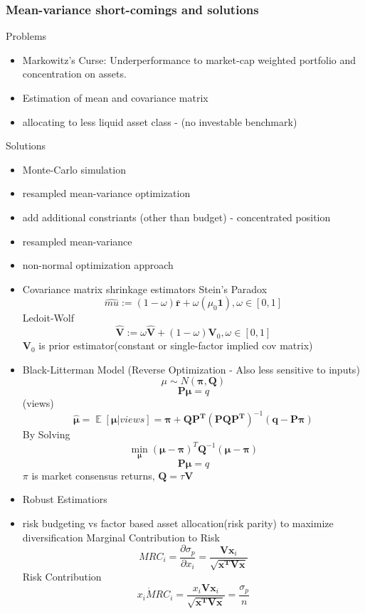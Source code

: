 \documentclass[11pt, openany]{book}              %
\DeclareMathOperator{\E}{\mathbb{E}}
\begin{document}
\subsubsection{Mean-variance short-comings and solutions}

Problems
\begin{itemize}
	\item Markowitz's Curse: Underperformance to market-cap weighted portfolio and concentration on assets.
	\item Estimation of mean and covariance matrix
	\item  allocating to less liquid asset class - (no investable benchmark)
\end{itemize}

Solutions
\begin{itemize}
	\item Monte-Carlo simulation
	\item resampled mean-variance optimization
    \item add additional constriants (other than budget) - concentrated position
    \item resampled mean-variance
    \item  non-normal optimization approach
     \item Covariance matrix shrinkage estimators
      \subitem Stein's Paradox 
      $$\hat{mu} := (1-\omega) \bar{\mathbf{r}} + \omega(\mu_0 \mathbf{1}),\omega \in [0,1]$$
      \subitem Ledoit-Wolf
      $$\hat{\mathbf{V}} := \omega\hat{\mathbf{V}} + (1-\omega)\mathbf{V}_0 ,\omega \in [0,1]$$
      $\mathbf{V}_0$ is prior estimator(constant or single-factor implied cov matrix) 
     \item Black-Litterman Model (Reverse Optimization - Also less sensitive to inputs)
     $$ \mu \sim N(\mathbf{\pi}, \mathbf{Q})$$
     $$ \boldsymbol{P\mu} = q$$ (views)
     $$ \hat{\boldsymbol{\mu}} = \E[\boldsymbol{\mu} | views] = \boldsymbol{\pi} + \mathbf{QP^T}(\mathbf{PQP^T})^{-1}(\mathbf{q} - \boldsymbol{P\pi})$$
     By Solving
     $$ \min_{\boldsymbol{\mu}}(\boldsymbol{\mu} - \boldsymbol{\pi})^T \mathbf{Q}^{-1}(\boldsymbol{\mu} - \boldsymbol{\pi}) $$
	$$\boldsymbol{P\mu} = q$$
     $\pi$ is market consensus returns, $\mathbf{Q} = \tau\mathbf{V}$
     \item Robust Estimatiors
     \item  risk budgeting vs factor based asset allocation(risk parity) to maximize diversification
     \subitem Marginal Contribution to Risk $$MRC_i = \frac{\partial \sigma_p}{\partial x_i} = \frac{\boldsymbol{Vx}_i}{\sqrt{\mathbf{x^TVx}}}$$
     \subitem Risk Contribution $$ x_i \dot MRC_i = \frac{x_i \boldsymbol{Vx}_i}{\sqrt{\mathbf{x^TVx}}} = \frac{\sigma_p}{n}$$
\end{itemize}	
\end{document}
